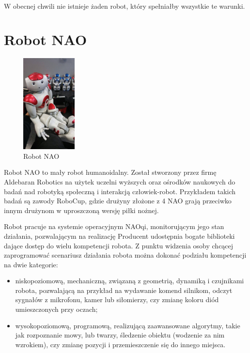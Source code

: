 W obecnej chwili nie istnieje żaden robot, który spełniałby wszystkie te warunki.


\section{Robot NAO}

\begin{figure}
    \centering
    \includegraphics[width=0.25\textwidth]{images/nao.jpg}
    \caption{Robot NAO}
\end{figure}

Robot NAO to mały robot humanoidalny. Został stworzony przez firmę Aldebaran Robotics na użytek uczelni wyższych oraz ośrodków naukowych do badań nad robotyką społeczną i interakcją człowiek-robot. Przykładem takich badań są zawody RoboCup, gdzie drużyny złożone z 4 NAO grają przeciwko innym drużynom w uproszczoną wersję piłki nożnej. 

Robot pracuje na systemie operacyjnym NAOqi, monitorującym jego stan działania, pozwalającym na realizację
Producent udostępnia bogate biblioteki dające dostęp do wielu kompetencji robota. Z punktu widzenia osoby chcącej zaprogramować scenariusz działania robota można dokonać podziału kompetencji na dwie kategorie: 
\begin{itemize}
    \setlength\itemsep{-0.4em}
    \item niskopoziomową, mechaniczną, związaną z geometrią, dynamiką i czujnikami robota, pozwalającą na przykład na wydawanie komend silnikom, odczyt sygnałów z mikrofonu, kamer lub siłomierzy, czy zmianę koloru diód umieszczonych przy oczach; 
    \item wysokopoziomową, programową, realizującą zaawansowane algorytmy, takie jak rozpoznanie mowy, lub twarzy, śledzenie obiektu (wodzenie za nim wzrokiem), czy zmianę pozycji i przemieszczenie się do innego miejsca. 
\end{itemize}

